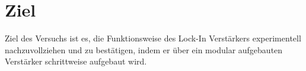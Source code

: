 \section{Ziel}
\label{sec:Ziel}

Ziel des Versuchs ist es, die Funktionsweise des Lock-In Verstärkers
experimentell nachzuvollziehen und zu bestätigen, indem er über ein
modular aufgebauten Verstärker schrittweise aufgebaut wird.
